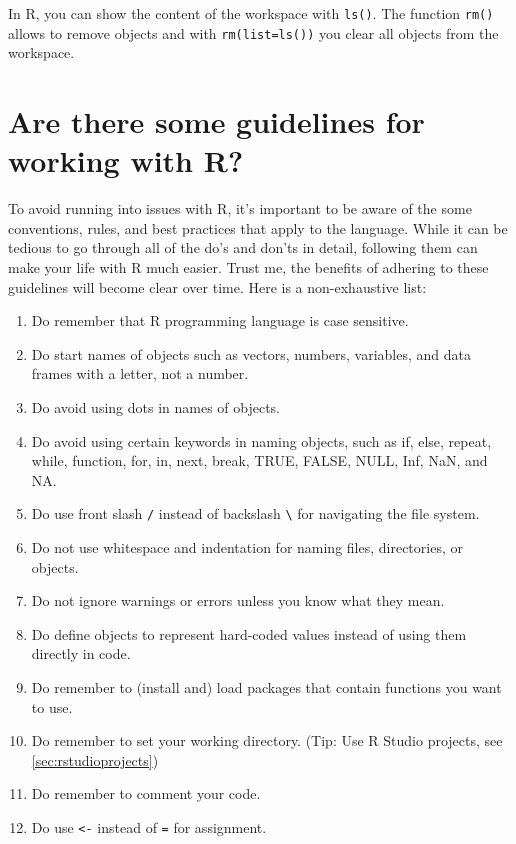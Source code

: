 \documentclass[
  12pt,
  oneside]{book}
\providecommand{\tightlist}{%
  \setlength{\itemsep}{0pt}\setlength{\parskip}{0pt}}
\begin{document}
In R, you can show the content of the workspace with \texttt{ls()}. The function \texttt{rm()} allows to remove objects and with \texttt{rm(list=ls())} you clear all objects from the workspace.

\hypertarget{are-there-some-guidelines-for-working-with-r}{%
\section{Are there some guidelines for working with R?}\label{are-there-some-guidelines-for-working-with-r}}

To avoid running into issues with R, it's important to be aware of the some conventions, rules, and best practices that apply to the language. While it can be tedious to go through all of the do's and don'ts in detail, following them can make your life with R much easier. Trust me, the benefits of adhering to these guidelines will become clear over time. Here is a non-exhaustive list:

\begin{enumerate}
\def\labelenumi{\arabic{enumi}.}
\tightlist
\item
  Do remember that R programming language is case sensitive.
\item
  Do start names of objects such as vectors, numbers, variables, and data frames with a letter, not a number.
\item
  Do avoid using dots in names of objects.
\item
  Do avoid using certain keywords in naming objects, such as if, else, repeat, while, function, for, in, next, break, TRUE, FALSE, NULL, Inf, NaN, and NA.
\item
  Do use front slash \texttt{/} instead of backslash \texttt{\textbackslash{}} for navigating the file system.
\item
  Do not use whitespace and indentation for naming files, directories, or objects.
\item
  Do not ignore warnings or errors unless you know what they mean.
\item
  Do define objects to represent hard-coded values instead of using them directly in code.
\item
  Do remember to (install and) load packages that contain functions you want to use.
\item
  Do remember to set your working directory. (Tip: Use R Studio projects, see \ref{sec:rstudioprojects})
\item
  Do remember to comment your code.
\item
  Do use \texttt{\textless{}-} instead of \texttt{=} for assignment.
\end{enumerate}
\end{document}

